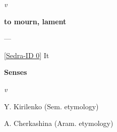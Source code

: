 \documentclass[10pt, a4paper, twocolumn, twoside]{book}
\begin{document}
    

    \textit{v}

    \textbf{to mourn, lament}


    \medskip{} --- 
    \begin{Large}\textsyriac{\hyperlink{gfcf84d88-f002-4247-825a-0fa99836875d}{}}\end{Large} [\href{https://sedra.bethmardutho.org/lexeme/get/0}{Sedra-ID 0}] It

    \medskip{}
    \textbf{Senses}

    

    \textit{v}

    \textcolor{Dandelion}{Y. Kirilenko (Sem. etymology)}

    \textcolor{Dandelion}{A. Cherkashina (Aram. etymology)}
\end{document}
